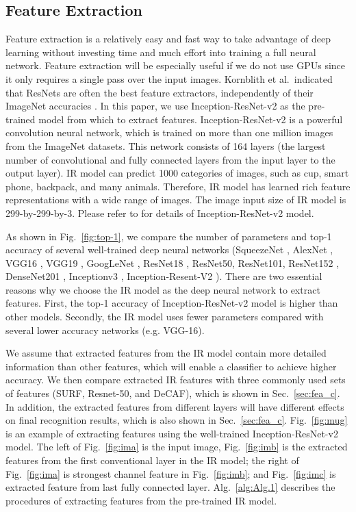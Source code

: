 \documentclass[10pt, conference, compsocconf]{IEEEtran}
\begin{document}
\subsection{Feature Extraction}
Feature extraction is a relatively easy and fast way to take advantage of deep learning without investing time and much effort into training a full neural network. Feature extraction will be especially useful if we do not use GPUs since it only requires a single pass over the input images. Kornblith et al.\  indicated that ResNets are often the best feature extractors, independently of their ImageNet accuracies \cite{kornblith2018better}. In this paper, we use Inception-ResNet-v2 as the pre-trained model from which to extract features. Inception-ResNet-v2 is a powerful convolution neural network, which is trained on more than one million images from the ImageNet datasets. This network consists of 164 layers (the largest number of convolutional and fully connected layers from the input layer to the output layer). IR model can predict 1000 categories of images, such as cup, smart phone, backpack, and many animals. Therefore, IR model has learned rich feature representations with a wide range of images. The image input size of IR model is 299-by-299-by-3. Please refer to \cite{szegedy2017inception} for details of Inception-ResNet-v2  model.


As shown in Fig.~\ref{fig:top-1}, we compare the number of parameters and top-1 accuracy of several well-trained deep neural networks (SqueezeNet \cite{iandola2016squeezenet} , AlexNet \cite{krizhevsky2012imagenet}, VGG16  \cite{simonyan2014very}, VGG19 \cite{simonyan2014very}, GoogLeNet  \cite{szegedy2015going}, ResNet18 \cite{he2016deep}, ResNet50, ResNet101, ResNet152 \cite{he2016deep}, DenseNet201 \cite{huang2017densely}, Inceptionv3 \cite{szegedy2016rethinking}, Inception-Resent-V2   \cite{szegedy2017inception}).
There are two essential reasons why we choose the IR model as the deep neural network to extract features. First, the top-1 accuracy of Inception-ResNet-v2 model is higher than other models. Secondly, the IR model uses fewer parameters compared with several lower accuracy networks (e.g. VGG-16).
 
We assume that extracted features from the IR model contain more detailed information than other features, which will enable a classifier to achieve higher accuracy. We then compare extracted IR features with three commonly used sets of features (SURF, Resnet-50, and DeCAF), which is shown in Sec.~\ref{sec:fea_c}.  In addition, the extracted features from different layers will have different effects on final recognition results, which is also shown in Sec.~\ref{sec:fea_c}.  Fig.~\ref{fig:mug} is an example of extracting features using the well-trained Inception-ResNet-v2 model. The left of Fig.~\ref{fig:ima} is the input image, Fig.~\ref{fig:imb} is the extracted features from the first conventional layer in the IR model; the right of Fig.~\ref{fig:ima} is strongest channel feature in Fig.~\ref{fig:imb}; and Fig.~\ref{fig:imc} is extracted feature from last fully connected layer. Alg.~\ref{alg:Alg.1} describes the procedures of extracting features from the pre-trained IR model.                                                                                      
\end{document}
